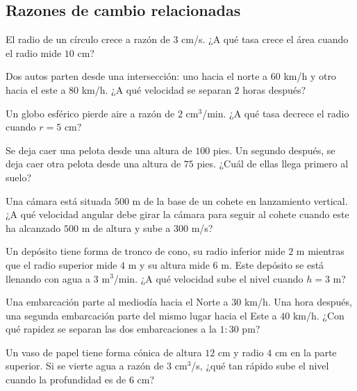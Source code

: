 \subsection{Razones de cambio relacionadas}

\begin{prob}
El radio de un círculo crece a razón de $3$ cm/s. ¿A qué tasa crece
el área cuando el radio mide $10$ cm?
\end{prob}

\begin{prob}
Dos autos parten desde una intersección: uno hacia el norte a $60$
km/h y otro hacia el este a $80$ km/h. ¿A qué velocidad se separan
$2$ horas después?
\end{prob}

\begin{prob}
Un globo esférico pierde aire a razón de $2$ cm$^3$/min. ¿A qué tasa
decrece el radio cuando $r=5$ cm?
\end{prob}

\begin{prob}
Se deja caer una pelota desde una altura de $100$ pies. Un segundo después, se deja caer otra pelota desde una altura de $75$ pies. ¿Cuál de ellas llega primero al suelo?
\end{prob}

\begin{prob}
Una cámara está situada $500$ m de la base de un cohete en lanzamiento
vertical. ¿A qué velocidad angular debe girar la cámara para seguir
al cohete cuando este ha alcanzado $500$ m de altura y sube a $300$ m/s?
\end{prob}

\begin{prob}
Un depósito tiene forma de tronco de cono, su radio inferior mide $2$ m mientras que el radio superior mide $4$ m y su altura mide $6$ m. Este depósito se está llenando con agua a $3$ m$^3$/min.
¿A qué velocidad sube el nivel cuando $h=3$ m?
\end{prob}

\begin{prob}
Una embarcación parte al mediodía hacia el Norte a $30$ km/h. Una hora
después, una segunda embarcación parte del mismo lugar hacia el Este a
$40$ km/h. ¿Con qué rapidez se separan las dos embarcaciones a la
$1{:}30$ pm?
\end{prob}

\begin{prob}
Un vaso de papel tiene forma cónica de altura $12$ cm y radio $4$ cm
en la parte superior. Si se vierte agua a razón de $3$ cm$^3$/s,
¿qué tan rápido sube el nivel cuando la profundidad es de $6$ cm?
\end{prob}

